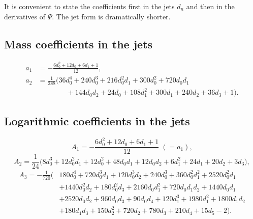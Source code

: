 \documentclass[11pt,oneside]{article}
\theoremstyle{definition}
\theoremstyle{remark}
\begin{document}
It is convenient to state the coefficients first in the jets $d_n$ and then in
the derivatives of $\Psi$.  The jet form is dramatically shorter.

\subsection{Mass coefficients in the jets}

\[
\begin{aligned}
  a_1&=-\frac{6d_0^2+12d_0+6d_1+1}{12},\\[0.3em]
  a_2&=\frac{1}{288}\bigl(36d_0^4+240d_0^3+216d_0^2d_1+300d_0^2+720d_0d_1\\
     &\qquad\qquad+144d_0d_2+24d_0+108d_1^2+300d_1+240d_2+36d_3+1\bigr).
\end{aligned}
\]

\subsection{Logarithmic coefficients in the jets}

\[
  A_1=-\frac{6d_0^2+12d_0+6d_1+1}{12}\;(=a_1),
\]
\begin{equation}\label{smallarg:eq:A2jets}
  A_2=\frac{1}{24}\bigl(8d_0^3+12d_0^2d_1+12d_0^2+48d_0d_1+12d_0d_2
      +6d_1^2+24d_1+20d_2+3d_3\bigr),
\end{equation}
\begin{equation}\label{smallarg:eq:A3jets}
\begin{aligned}
  A_3=-\frac{1}{720}\bigl(&180d_0^4+720d_0^3d_1+120d_0^3d_2+240d_0^3
    +360d_0^2d_1^2+2520d_0^2d_1\\
   &+1440d_0^2d_2+180d_0^2d_3+2160d_0d_1^2+720d_0d_1d_2+1440d_0d_1\\
   &+2520d_0d_2+960d_0d_3+90d_0d_4+120d_1^3+1980d_1^2+1800d_1d_2\\
   &+180d_1d_3+150d_2^2+720d_2+780d_3+210d_4+15d_5-2\bigr).
\end{aligned}
\end{equation}
\end{document}

